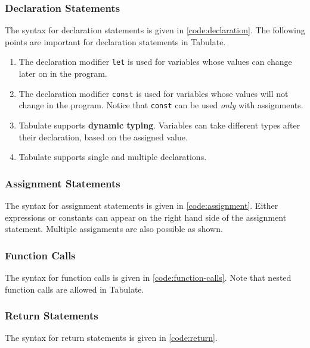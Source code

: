 \documentclass[conference,compsoc]{IEEEtran}
\begin{document}
\subsubsection{Declaration Statements}
The syntax for declaration statements is given in \autoref{code:declaration}.
The following points are important for declaration statements in Tabulate.

\begin{enumerate}
  \item The declaration modifier \texttt{let} is used for variables whose values
  can change later on in the program.
  \item The declaration modifier \texttt{const} is used for variables whose
  values will not change in the program. Notice that \texttt{const} can be used
  \emph{only} with assignments.
  \item Tabulate supports \textbf{dynamic typing}. Variables can take different
  types after their declaration, based on the assigned value.
  \item Tabulate supports single and multiple declarations.
\end{enumerate}



\subsubsection{Assignment Statements}
The syntax for assignment statements is given in \autoref{code:assignment}.
Either expressions or constants can appear on the right hand side of the
assignment statement. Multiple assignments are also possible as shown.



\subsubsection{Function Calls}
The syntax for function calls is given in \autoref{code:function-calls}. Note
that nested function calls are allowed in Tabulate.



\subsubsection{Return Statements}
The syntax for return statements is given in \autoref{code:return}.
\end{document}
